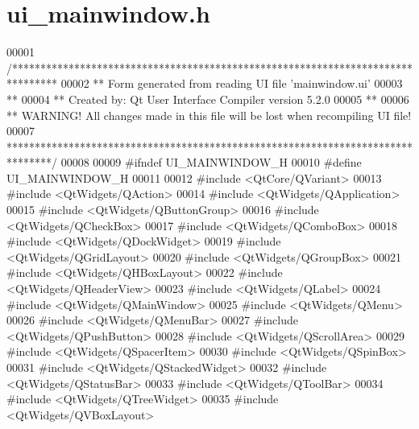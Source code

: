 \hypertarget{a00139_source}{\section{ui\+\_\+mainwindow.\+h}
\label{a00139_source}
}

\begin{DoxyCode}
00001 \textcolor{comment}{/********************************************************************************}
00002 \textcolor{comment}{** Form generated from reading UI file 'mainwindow.ui'}
00003 \textcolor{comment}{**}
00004 \textcolor{comment}{** Created by: Qt User Interface Compiler version 5.2.0}
00005 \textcolor{comment}{**}
00006 \textcolor{comment}{** WARNING! All changes made in this file will be lost when recompiling UI file!}
00007 \textcolor{comment}{********************************************************************************/}
00008 
00009 \textcolor{preprocessor}{#ifndef UI\_MAINWINDOW\_H}
00010 \textcolor{preprocessor}{#define UI\_MAINWINDOW\_H}
00011 
00012 \textcolor{preprocessor}{#include <QtCore/QVariant>}
00013 \textcolor{preprocessor}{#include <QtWidgets/QAction>}
00014 \textcolor{preprocessor}{#include <QtWidgets/QApplication>}
00015 \textcolor{preprocessor}{#include <QtWidgets/QButtonGroup>}
00016 \textcolor{preprocessor}{#include <QtWidgets/QCheckBox>}
00017 \textcolor{preprocessor}{#include <QtWidgets/QComboBox>}
00018 \textcolor{preprocessor}{#include <QtWidgets/QDockWidget>}
00019 \textcolor{preprocessor}{#include <QtWidgets/QGridLayout>}
00020 \textcolor{preprocessor}{#include <QtWidgets/QGroupBox>}
00021 \textcolor{preprocessor}{#include <QtWidgets/QHBoxLayout>}
00022 \textcolor{preprocessor}{#include <QtWidgets/QHeaderView>}
00023 \textcolor{preprocessor}{#include <QtWidgets/QLabel>}
00024 \textcolor{preprocessor}{#include <QtWidgets/QMainWindow>}
00025 \textcolor{preprocessor}{#include <QtWidgets/QMenu>}
00026 \textcolor{preprocessor}{#include <QtWidgets/QMenuBar>}
00027 \textcolor{preprocessor}{#include <QtWidgets/QPushButton>}
00028 \textcolor{preprocessor}{#include <QtWidgets/QScrollArea>}
00029 \textcolor{preprocessor}{#include <QtWidgets/QSpacerItem>}
00030 \textcolor{preprocessor}{#include <QtWidgets/QSpinBox>}
00031 \textcolor{preprocessor}{#include <QtWidgets/QStackedWidget>}
00032 \textcolor{preprocessor}{#include <QtWidgets/QStatusBar>}
00033 \textcolor{preprocessor}{#include <QtWidgets/QToolBar>}
00034 \textcolor{preprocessor}{#include <QtWidgets/QTreeWidget>}
00035 \textcolor{preprocessor}{#include <QtWidgets/QVBoxLayout>}

\end{DoxyCode}
